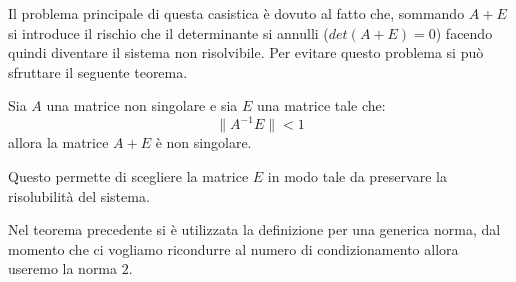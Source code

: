 Il problema principale di questa casistica è dovuto al fatto che, sommando $A + E$
si introduce il rischio che il determinante si annulli ($det(A + E) = 0$) facendo
quindi diventare il sistema non risolvibile. Per evitare questo problema si può
sfruttare il seguente teorema.
\begin{teorema}
    Sia $A$ una matrice non singolare e sia $E$ una matrice tale che:
    \begin{equation*}
        \| A^{-1}E \| < 1
    \end{equation*}
    allora la matrice $A + E$ è non singolare.
\end{teorema}
Questo permette di scegliere la matrice $E$ in modo tale da preservare la
risolubilità del sistema.
\begin{nota}
    Nel teorema precedente si è utilizzata la definizione per una generica norma,
    dal momento che ci vogliamo ricondurre al numero di condizionamento allora
    useremo la norma $2$.
\end{nota}

